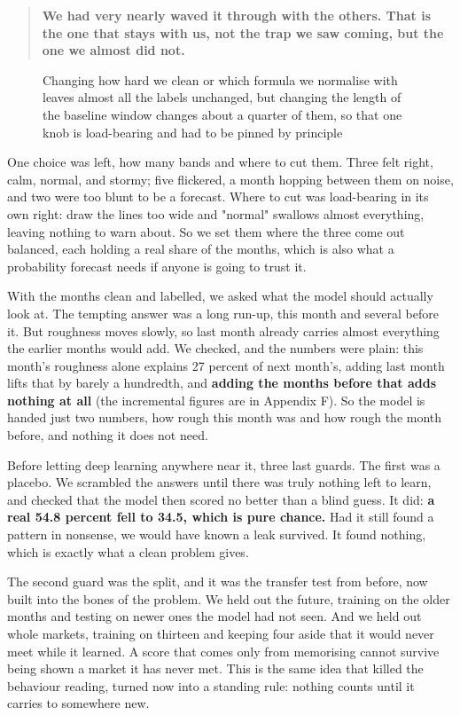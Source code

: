 \documentclass[11pt]{article} %
\begin{document}
\begin{quote}
\textbf{We had very nearly waved it through with the others. That is the one that stays with us, not the trap we saw coming, but the one we almost did not.}
\end{quote}


\begin{figure}[htbp]
\centering

\caption{Changing how hard we clean or which formula we normalise with leaves almost all the labels unchanged, but changing the length of the baseline window changes about a quarter of them, so that one knob is load-bearing and had to be pinned by principle}
\end{figure}


One choice was left, how many bands and where to cut them. Three felt right, calm, normal, and stormy; five flickered, a month hopping between them on noise, and two were too blunt to be a forecast. Where to cut was load-bearing in its own right: draw the lines too wide and "normal" swallows almost everything, leaving nothing to warn about. So we set them where the three come out balanced, each holding a real share of the months, which is also what a probability forecast needs if anyone is going to trust it.

With the months clean and labelled, we asked what the model should actually look at. The tempting answer was a long run-up, this month and several before it. But roughness moves slowly, so last month already carries almost everything the earlier months would add. We checked, and the numbers were plain: this month's roughness alone explains 27 percent of next month's, adding last month lifts that by barely a hundredth, and \textbf{adding the months before that adds nothing at all} (the incremental figures are in Appendix F). So the model is handed just two numbers, how rough this month was and how rough the month before, and nothing it does not need.

Before letting deep learning anywhere near it, three last guards. The first was a placebo. We scrambled the answers until there was truly nothing left to learn, and checked that the model then scored no better than a blind guess. It did: \textbf{a real 54.8 percent fell to 34.5, which is pure chance.} Had it still found a pattern in nonsense, we would have known a leak survived. It found nothing, which is exactly what a clean problem gives.

The second guard was the split, and it was the transfer test from before, now built into the bones of the problem. We held out the future, training on the older months and testing on newer ones the model had not seen. And we held out whole markets, training on thirteen and keeping four aside that it would never meet while it learned. A score that comes only from memorising cannot survive being shown a market it has never met. This is the same idea that killed the behaviour reading, turned now into a standing rule: nothing counts until it carries to somewhere new.
\end{document}
